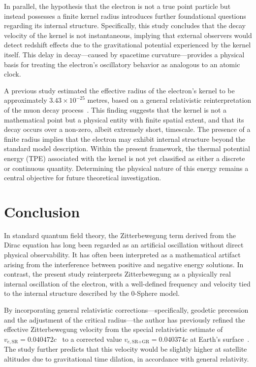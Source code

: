 \documentclass[%
 reprint,
 amsmath,amssymb,
 aps,
]{revtex4-1}
\numberwithin{equation}{section}%
\begin{document}
In parallel, the hypothesis that the electron is not a true point particle but instead possesses a finite kernel radius introduces further foundational questions regarding its internal structure. Specifically, this study concludes that the decay velocity of the kernel is not instantaneous, implying that external observers would detect redshift effects due to the gravitational potential experienced by the kernel itself. This delay in decay—caused by spacetime curvature—provides a physical basis for treating the electron’s oscillatory behavior as analogous to an atomic clock.

A previous study estimated the effective radius of the electron’s kernel to be approximately $3.43 \times 10^{-25}$ metres, based on a general relativistic reinterpretation of the muon decay process~\cite{hanamura2501.0130}. This finding suggests that the kernel is not a mathematical point but a physical entity with finite spatial extent, and that its decay occurs over a non-zero, albeit extremely short, timescale. The presence of a finite radius implies that the electron may exhibit internal structure beyond the standard model description. Within the present framework, the thermal potential energy (TPE) associated with the kernel is not yet classified as either a discrete or continuous quantity. Determining the physical nature of this energy remains a central objective for future theoretical investigation.


\section{Conclusion}

In standard quantum field theory, the Zitterbewegung term derived from the Dirac equation has long been regarded as an artificial oscillation without direct physical observability. It has often been interpreted as a mathematical artifact arising from the interference between positive and negative energy solutions. In contrast, the present study reinterprets Zitterbewegung as a physically real internal oscillation of the electron, with a well-defined frequency and velocity tied to the internal structure described by the 0-Sphere model.

By incorporating general relativistic corrections—specifically, geodetic precession and the adjustment of the critical radius—the author has previously refined the effective Zitterbewegung velocity from the special relativistic estimate of $v_{e,\text{SR}} = 0.040472c$~\cite{hanamura2309.0047} to a corrected value $v_{e,\text{SR+GR}} = 0.040374c$ at Earth's surface~\cite{hanamura2501.0130}. The study further predicts that this velocity would be slightly higher at satellite altitudes due to gravitational time dilation, in accordance with general relativity.
\end{document}
